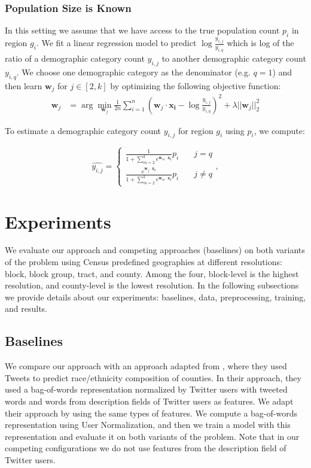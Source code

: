 \documentclass[letterpaper]{article}
\begin{document}
\subsubsection{Population Size is Known} In this setting we assume that we have access to the true population count $p_i$ in region $g_i$. We fit a linear regression model to predict $\log \frac{y_{i,j}}{y_{i,q}}$ which is log of the ratio of a demographic category count $y_{i,j}$ to another demographic category count $y_{i,q}$. We choose one demographic category as the denominator (e.g. $q=1$) and then learn $\mathbf{w}_j$ for $j \in [2,k]$ by optimizing the following objective function:
\begin{align*}
    \mathbf{w}_j &= \arg\min\limits_{\mathbf{w}_j} \frac{1}{2n} \sum_{i=1}^{n} (\mathbf{w}_j\cdot\mathbf{x_i} - \log \frac{y_{i,j}}{y_{i,q}} )^2 + \lambda||\mathbf{w}_j||_2^2
\end{align*}

To estimate a demographic category count $y_{i,j}$ for region $g_i$ using $p_i$, we compute:

\[
\hat{y_{i,j}} = \left\{
        \begin{array}{ll}
            \frac{1}{1 + \sum_{m=2}^{k} e^{\mathbf{w}_m\cdot\mathbf{x_i}}} p_i & \quad j=q \\[1em]
            \frac{e^{\mathbf{w}_j\cdot\mathbf{x_i}}}{1 + \sum_{m=2}^{k} e^{\mathbf{w}_m\cdot\mathbf{x_i} }} p_i & \quad j\neq q
        \end{array}
    \right.,
\]

\section{Experiments}

We evaluate our approach and competing approaches (baselines) on both variants of the problem using Census predefined geographies at different resolutions: block, block group, tract, and county. Among the four, block-level is the highest resolution, and county-level is the lowest resolution. In the following subsections we provide details about our experiments: baselines, data, preprocessing, training, and results. 

\subsection{Baselines}
We compare our approach with an approach adapted from \cite{mohammady2014using}, where they used Tweets to predict race/ethnicity composition of counties. In their approach, they used a bag-of-words representation normalized by Twitter users with tweeted words and words from description fields of Twitter users as features. We adapt their approach by using the same types of features. We compute a bag-of-words representation using User Normalization, and then we train a model with this representation and evaluate it on both variants of the problem. Note that in our competing configurations we do not use features from the description field of Twitter users.
\end{document}
